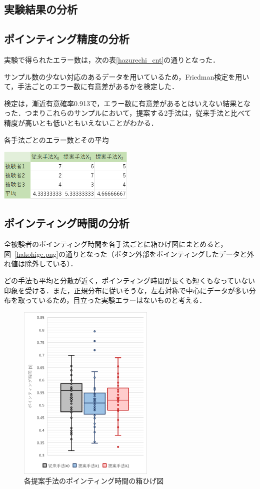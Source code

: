\documentclass[a4paper, papersize, titlepage]{jsarticle}
\begin{document}
\begin{multicols}{2}
\section{実験結果の分析}
\subsection{ポインティング精度の分析}
実験で得られたエラー数は，次の表\ref{hazurechi_cnt}の通りとなった．

サンプル数の少ない対応のあるデータを用いているため，Friedman検定を用いて，手法ごとのエラー数に有意差があるかを検定した．

検定は，漸近有意確率0.913で，エラー数に有意差があるとはいえない結果となった．つまりこれらのサンプルにおいて，提案する2手法は，従来手法と比べて精度が高いとも低いともいえないことがわかる．

\begin{table}[H]
 \centering
 \caption{各手法ごとのエラー数とその平均}
   \includegraphics[width=65mm]{hazurechi_cnt.png}
 \label{hazurechi_cnt}
\end{table}
\noindent


\subsection{ポインティング時間の分析}
全被験者のポインティング時間を各手法ごとに箱ひげ図にまとめると，図~\ref{hakohige.png}の通りとなった（ボタン外部をポインティングしたデータと外れ値は除外している）．

どの手法も平均と分散が近く，ポインティング時間が長くも短くもなっていない印象を受ける．また，正規分布に従いそうな，左右対称で中心にデータが多い分布を取っているため，目立った実験エラーはないものと考える．

\begin{figure}[H]
 \centering
   \includegraphics[width=65mm]{hakohige.png}
 \caption{各提案手法のポインティング時間の箱ひげ図}
 \label{hakohige}
\end{figure}
\noindent


\end{multicols}
\end{document}
